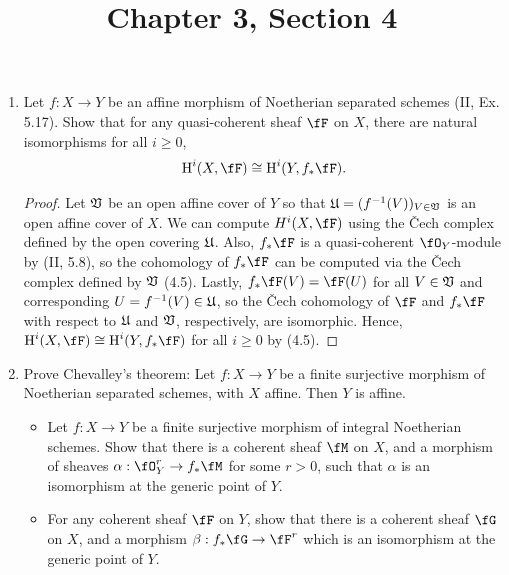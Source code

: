 \documentclass[a4paper]{article}
\title{Chapter 3, Section 4}
\begin{document}
\maketitle
\begin{enumerate} [label=\textbf{\arabic*.}, leftmargin=0em]

  \item Let $f : X \to Y$ be an affine morphism of Noetherian separated schemes (II, Ex. 5.17).
        Show that for any quasi-coherent sheaf $\fF$ on $X$, there are natural isomorphisms for all $i \geq 0$,
        \begin{equation*}
          \cH^i(X, \fF) \cong \cH^i(Y, f_* \fF).
        \end{equation*}

        \begin{proof}
          Let $\mathfrak{V}$ be an open affine cover of $Y$ so that $\mathfrak{U} = (f^{-1}(V))_{V \in \mathfrak{V}}$ is an open affine cover of $X$.
          We can compute $H^i(X, \fF)$ using the Čech complex defined by the open covering $\mathfrak{U}$.
          Also, $f_*\fF$ is a quasi-coherent $\fO_Y$-module by (II, 5.8), so the cohomology of $f_*\fF$ can be computed via the Čech complex defined by $\mathfrak{V}$ (4.5).
          Lastly, $f_*\fF(V) = \fF(U)$ for all $V \in \mathfrak{V}$ and corresponding $U = f^{-1}(V) \in \mathfrak{U}$, so the Čech cohomology of $\fF$ and $f_*\fF$ with respect to $\mathfrak{U}$ and $\mathfrak{V}$, respectively, are isomorphic.
          Hence, $\cH^i(X, \fF) \cong \cH^i(Y, f_*\fF)$ for all $i \geq 0$ by (4.5).
        \end{proof}

  \item Prove Chevalley's theorem: Let $f : X \to Y$ be a finite surjective morphism of Noetherian separated schemes, with $X$ affine. Then $Y$ is affine.
        \begin{itemize}
          \item[(a)] Let $f : X \to Y$ be a finite surjective morphism of integral Noetherian schemes.
                Show that there is a coherent sheaf $\fM$ on $X$, and a morphism of sheaves $\alpha : \fO_Y^r \to f_* \fM$ for some $r > 0$, such that $\alpha$ is an isomorphism at the generic point of $Y$.

          \item[(b)] For any coherent sheaf $\fF$ on $Y$, show that there is a coherent sheaf $\fG$ on $X$, and a morphism $\beta : f_* \fG \to \fF^r$ which is an isomorphism at the generic point of $Y$.


\end{itemize}
\end{enumerate}
\end{document}
